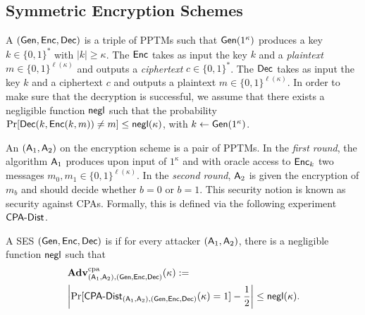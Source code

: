 \subsection*{Symmetric Encryption Schemes}
A  $(\operatorname{\mathsf{Gen}}, \operatorname{\mathsf{Enc}},\operatorname{\mathsf{Dec}})$ is a triple of
\acp{PPTM} such that $\operatorname{\mathsf{Gen}}(1^{\kappa})$ produces a key
$k\in \{0,1\}^{*}$ with $|k|\geq \kappa$. The  $\operatorname{\mathsf{Enc}}$ takes as input the key $k$ and a \emph{plaintext}
$m\in \{0,1\}^{\ell(\kappa)}$ and outputs a \emph{ciphertext}
$c\in \{0,1\}^{*}$. The  $\operatorname{\mathsf{Dec}}$ takes as
input the key $k$ and a ciphertext $c$ and outputs a plaintext
$m\in \{0,1\}^{\ell(\kappa)}$. In order to make sure that the decryption
is successful, we assume that there exists a negligible function $\operatorname{\mathsf{negl}}$
such that the probability
$\Pr[\operatorname{\mathsf{Dec}}(k,\operatorname{\mathsf{Enc}}(k,m))\neq m]\leq\operatorname{\mathsf{negl}}(\kappa)$, with
$k\gets \operatorname{\mathsf{Gen}}(1^{\kappa})$. 

An  $(\operatorname{\mathsf{A}}_{1},\operatorname{\mathsf{A}}_{2})$ on
the encryption scheme is a pair of \acp{PPTM}. In the \emph{first
  round}, the algorithm $\operatorname{\mathsf{A}}_{1}$ produces upon input of $1^{\kappa}$
and with oracle access to $\operatorname{\mathsf{Enc}}_{k}$ two messages $m_{0},m_{1}\in
\{0,1\}^{\ell(\kappa)}$. In the \emph{second round}, $\operatorname{\mathsf{A}}_{2}$ is given
the encryption of $m_{b}$ and should decide whether $b=0$ or
$b=1$. This security notion is known as security against \acp{CPA}. 
Formally, this is defined via the following experiment
$\CPA-Dist$.


A \ac{SES} $(\operatorname{\mathsf{Gen}},\operatorname{\mathsf{Enc}},\operatorname{\mathsf{Dec}})$ is  if for every
attacker $(\operatorname{\mathsf{A}}_{1},\operatorname{\mathsf{A}}_{2})$, there is a negligible function $\operatorname{\mathsf{negl}}$
such that 
\begin{align*}
  &\Adv_{(\Att_{1},\Att_{2}),(\Gen,\Enc,\Dec)}^{\cpa}(\kappa) :=\\
  &\left|\Pr[\CPA-Dist_{(\Att_{1},\Att_{2}),(\Gen,\Enc,\Dec)}(\kappa)=1]
    - \frac{1}{2}\right|\leq \negl(\kappa).
\end{align*}

